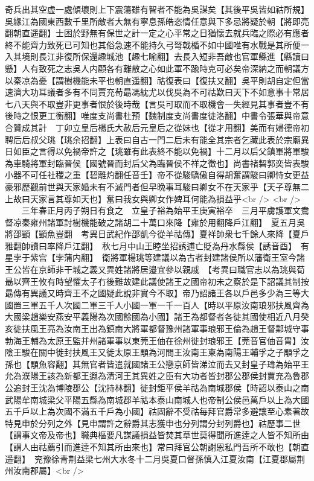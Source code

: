 奇兵出其空虚一處傾壞則上下震蕩雖有智者不能為吳謀矣【其後平吳皆如祜所規】吳緣江為國東西數千里所敵者大無有寧息孫皓恣情任意與下多忌將疑於朝【將即亮翻朝直遥翻】士困於野無有保世之計一定之心平常之日猶懷去就兵臨之際必有應者終不能齊力致死已可知也其俗急速不能持久弓弩戟楯不如中國唯有水戰是其所便一入其境則長江非復所保還趣城池【趣七喻翻】去長入短非吾敵也官軍縣進【縣讀曰懸】人有致死之志吳人内顧各有離散之心如此軍不踰時克可必矣帝深納之而朝議方以秦凉為憂【謂樹機能未平也朝直遥翻】祜復表曰【復扶又翻】吳平則胡自定但當速濟大功耳議者多有不同賈充荀朂馮紞尤以伐吳為不可祜歎曰天下不如意事十常居七八天與不取豈非更事者恨於後時哉【言吳可取而不取機會一失經見其事者豈不有後時之恨更工衡翻】唯度支尚書杜預【魏制度支尚書度徒洛翻】中書令張華與帝意合贊成其計　丁卯立皇后楊氏大赦后元皇后之從妹也【從才用翻】美而有婦德帝初聘后后叔父珧【珧余招翻】上表曰自古一門二后未有能全其宗者乞藏此表於宗廟異日如臣之言得以免禍帝許之【珧雖有此表終不能以免禍】十二月以后父鎮軍將軍駿為車騎將軍封臨晉侯【國號晉而封后父為臨晉侯不祥之徵也】尚書禇䂮郭奕皆表駿小器不可任社稷之重【䂮離灼翻任音壬】帝不從駿驕傲自得胡奮謂駿曰卿恃女更益豪邪歷觀前世與天家婚未有不滅門者但早晩事耳駿曰卿女不在天家乎【天子尊無二上故曰天家言其尊如天也】奮曰我女與卿女作婢耳何能為損益乎<br />
<br />
　　三年春正月丙子朔日有食之　立皇子裕為始平王庚寅裕卒　三月平虜護軍文鴦督凉秦雍州諸軍討樹機能破之諸胡二十萬口來降【雍於用翻降戶江翻】　夏五月吳將邵顗【顗魚豈翻　考異日武紀作邵凱今從羊祜傳】夏祥帥衆七千餘人來降【夏戶雅翻帥讀曰率降戶江翻】　秋七月中山王睦坐招誘逋亡貶為丹水縣侯【誘音酉】　有星孛于紫宫【孛蒲内翻】　衛將軍楊珧等建議以為古者封建諸侯所以藩衛王室今諸王公皆在京師非干城之義又異姓諸將居邉宜參以親戚　【考異曰職官志以為珧與荀朂以齊王攸有時望懼太子冇後難故建此議使諸王之國帝初未之察於是下詔議其制按朂傳有異議又時齊王不之國疑此說非實今不取】帝乃詔諸王各以戶邑多少為三等大國置三軍五千人次國二軍三千人小國一軍一千一百人【時以平原汝南琅邪扶風齊為大國梁趙樂安燕安平義陽為次國餘國為小國】諸王為都督者各徙其國使相近八月癸亥徙扶風王亮為汝南王出為鎮南大將軍都督豫州諸軍事琅邪王倫為趙王督鄴城守事勃海王輔為太原王監并州諸軍事以東莞王伷在徐州徙封琅邪王【莞音官伷音胄】汝陰王駿在關中徙封扶風王又徙太原王顒為河間王汝南王柬為南陽王輔孚之子顒孚之孫也【顒魚容翻】其無官者皆遣就國諸王公戀京師皆涕泣而去又封皇子瑋為始平王允為濮陽王該為新都王遐為清河王其異姓之臣有大功者皆封郡公郡侯封賈充為魯郡公追封王沈為博陵郡公【沈持林翻】徙封鉅平侯羊祜為南城郡侯【時詔以泰山之南武陽牟南城梁父平陽五縣為南城郡羊祜本泰山南城人也帝制公侯邑萬戶以上為大國五千戶以上為次國不滿五千戶為小國】祜固辭不受祜每拜官爵常多避讓至心素著故特見申於分列之外【見申謂許之辭爵其志獲申也分列謂分封列爵也】祜歷事二世【謂事文帝及帝也】職典樞要凡謀議損益皆焚其草世莫得聞所進逹之人皆不知所由【謂人由祜薦引而進逹不知其所由來也】常曰拜官公朝謝恩私門吾所不敢也【朝直遥翻】　兖豫徐青荆益梁七州大水冬十二月吳夏口督孫慎入江夏汝南【江夏郡屬荆州汝南郡屬】<br />
